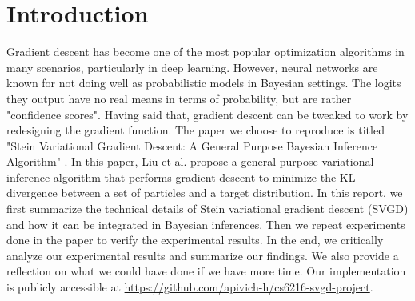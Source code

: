 \section{Introduction}
Gradient descent has become one of the most popular optimization algorithms in many scenarios, particularly in deep learning. However, neural networks are known for not doing well as probabilistic models in Bayesian settings. The logits they output have no real means in terms of probability, but are rather "confidence scores". Having said that, gradient descent can be tweaked to work by redesigning the gradient function. The paper we choose to reproduce is titled "Stein Variational Gradient Descent: A General Purpose Bayesian Inference Algorithm" \cite{ref_article_svgd}. In this paper, Liu et al. propose a general purpose variational inference algorithm that performs gradient descent to minimize the KL divergence between a set of particles and a target distribution. In this report, we first summarize the technical details of Stein variational gradient descent (SVGD) and how it can be integrated in Bayesian inferences. Then we repeat experiments done in the paper to verify the experimental results. In the end, we critically analyze our experimental results and summarize our findings. We also provide a reflection on what we could have done if we have more time. Our implementation is publicly accessible at \url{https://github.com/apivich-h/cs6216-svgd-project}.